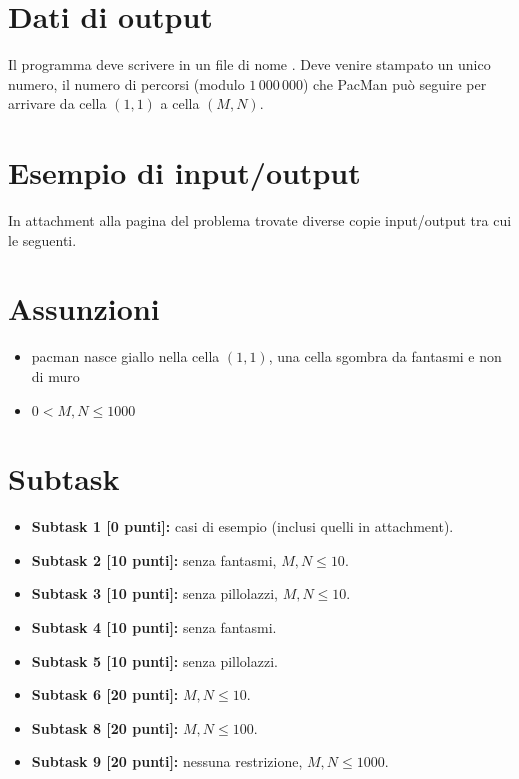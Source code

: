 \section*{Dati di output}
Il programma deve scrivere in un file di nome . Deve venire stampato un unico numero, il numero di percorsi (modulo $1\, 000\, 000$) che PacMan può seguire per arrivare da cella $(1,1)$ a cella $(M,N)$.


\section*{Esempio di input/output}

In attachment alla pagina del problema trovate diverse copie input/output tra cui le seguenti.

\vspace{0.5cm}


\section*{Assunzioni}
\begin{itemize}
\item pacman nasce giallo nella cella $(1, 1)$, una cella sgombra da fantasmi e non di muro
\item $0 < M,N \le 1000$
\end{itemize}

\section*{Subtask}
\begin{itemize}
\item \textbf{Subtask 1 [0 punti]:} casi di esempio (inclusi quelli in attachment).
\item \textbf{Subtask 2 [10 punti]:} senza fantasmi, $M,N \le 10$.
\item \textbf{Subtask 3 [10 punti]:} senza pillolazzi, $M,N \le 10$.
\item \textbf{Subtask 4 [10 punti]:} senza fantasmi.
\item \textbf{Subtask 5 [10 punti]:} senza pillolazzi.
\item \textbf{Subtask 6 [20 punti]:} $M,N \le 10$.
\item \textbf{Subtask 8 [20 punti]:} $M,N \le 100$.
\item \textbf{Subtask 9 [20 punti]:} nessuna restrizione, $M,N \le 1000$.
\end{itemize}



